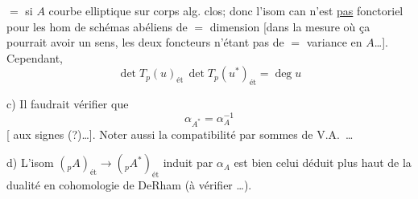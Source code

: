 $=$ si $A$ courbe elliptique sur corps alg. clos; donc l'isom can n'est \uline{pas} fonctoriel pour les hom de schémas abéliens de $=$ dimension [dans la mesure où ça pourrait avoir un sens, les deux foncteurs n'étant pas de $=$ variance en $A$\ldots]. Cependant, 
\[
\boxed{\det T_p(u)_{\text{ét}}\,\det T_p(u^*)_{\text{ét}}=\deg u}
\]

c) Il faudrait vérifier que
\[
\alpha_{A^*}=\alpha_A^{-1}
\]
[ aux signes (?)\ldots]. Noter aussi la compatibilité par sommes de V.A.\ \ldots

 d) L'isom $({}_pA)_{\text{ét}}\longrightarrow({}_pA^*)_{\text{ét}}$ induit par $\alpha_A$ est bien celui déduit plus haut de la dualité en cohomologie de DeRham (à vérifier \ldots).


